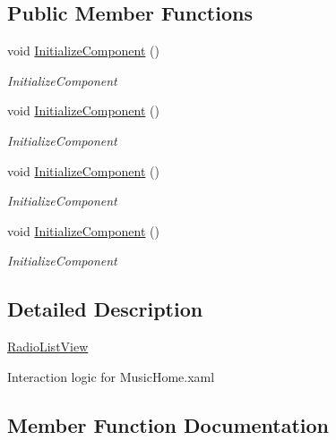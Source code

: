 \subsection*{Public Member Functions}
\begin{DoxyCompactItemize}
\item 
void \hyperlink{class_presentation_1_1_view_1_1_list_1_1_radio_list_view_a66633fd5cb1527cc49439c458bdd6ed8}{Initialize\+Component} ()
\begin{DoxyCompactList}\small\item\em Initialize\+Component \end{DoxyCompactList}\item 
void \hyperlink{class_presentation_1_1_view_1_1_list_1_1_radio_list_view_a66633fd5cb1527cc49439c458bdd6ed8}{Initialize\+Component} ()
\begin{DoxyCompactList}\small\item\em Initialize\+Component \end{DoxyCompactList}\item 
void \hyperlink{class_presentation_1_1_view_1_1_list_1_1_radio_list_view_a66633fd5cb1527cc49439c458bdd6ed8}{Initialize\+Component} ()
\begin{DoxyCompactList}\small\item\em Initialize\+Component \end{DoxyCompactList}\item 
void \hyperlink{class_presentation_1_1_view_1_1_list_1_1_radio_list_view_a66633fd5cb1527cc49439c458bdd6ed8}{Initialize\+Component} ()
\begin{DoxyCompactList}\small\item\em Initialize\+Component \end{DoxyCompactList}\end{DoxyCompactItemize}


\subsection{Detailed Description}
\hyperlink{class_presentation_1_1_view_1_1_list_1_1_radio_list_view}{Radio\+List\+View} 

Interaction logic for Music\+Home.\+xaml 

\subsection{Member Function Documentation}
\mbox{\label{class_presentation_1_1_view_1_1_list_1_1_radio_list_view_a66633fd5cb1527cc49439c458bdd6ed8}} 
